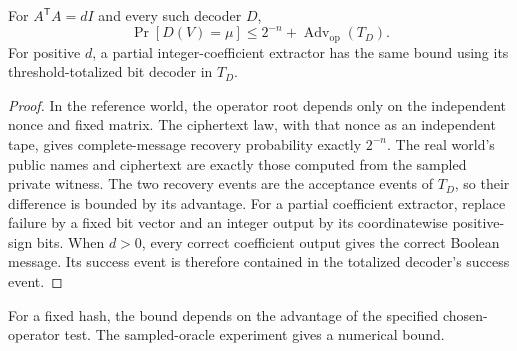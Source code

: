 \begin{theorem}
\label{thm:coupled-instance-recovery}
For \(A^{\mathsf T}A=dI\) and every such decoder \(D\),
\[
 \Pr[D(V)=\mu]\leq 2^{-n}+\operatorname{Adv}_{\mathrm{op}}(T_D).
\]
For positive \(d\), a partial integer-coefficient extractor has the same
bound using its threshold-totalized bit decoder in \(T_D\).
\end{theorem}

\begin{proof}
In the reference world, the operator root depends only on the independent
nonce and fixed matrix. The ciphertext law, with that nonce as an
independent tape, gives complete-message recovery probability exactly
\(2^{-n}\). The real world's public names and ciphertext are exactly those
computed from the sampled private witness. The two recovery events are the
acceptance events of \(T_D\), so their difference is bounded by its
advantage. For a partial coefficient extractor, replace failure by a fixed
bit vector and an integer output by its coordinatewise positive-sign bits.
When \(d>0\), every correct coefficient output gives the correct Boolean
message. Its success event is therefore contained in the totalized decoder's
success event.
\end{proof}

For a fixed hash, the bound depends on the advantage of the specified
chosen-operator test. The sampled-oracle experiment gives a numerical bound.
